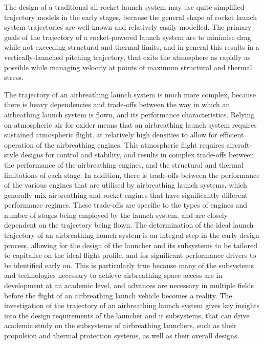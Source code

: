  
    The design of a traditional all-rocket launch system may use quite simplified trajectory models in the early stages, because the general shape of rocket launch system trajectories are well-known and relatively easily modelled.  The primary goals of the trajectory of a rocket-powered launch system are to minimise drag while not exceeding structural and thermal limits, and in general this results in a vertically-launched pitching trajectory, that exits the atmosphere as rapidly as possible while managing velocity at points of maximum structural and thermal stress. 
    
    The trajectory of an airbreathing launch system is much more complex, because there is heavy dependencies and trade-offs between the way in which an airbeathing launch system is flown, and its performance characteristics. Relying on atmospheric air for oxider means that an airbreathing launch system requires sustained atmospheric flight, at relatively high densities to allow for efficient operation of the airbreathing engines. This atmospheric flight requires aircraft-style designs for control and stability, and results in complex trade-offs between the performance of the airbreathing engines, and the structural and thermal limitations of each stage. In addition, there is trade-offs between the performance of the various engines that are utilised by airbreathing launch systems, which generally mix airbreathing and rocket engines that have significantly different performance regimes.
    These trade-offs are specific to the types of engines and number of stages being employed by the launch system, and are closely dependent on the trajectory being flown. The determination of the ideal launch trajectory of an airbreathing launch system is an integral step in the early design process, allowing for the design of the launcher and its subsystems to be tailored to capitalise on the ideal flight profile, and for significant performance drivers to be identified early on. 
  This is particularly true because many of the subsystems and technologies necessary to achieve airbreathing space access are in development at an academic level, and advances are necessary in multiple fields before the flight of an airbreathing launch vehicle becomes a reality. The investigation of the trajectory of an airbreathing launch system gives key insights into the design requirements of the launcher and it subsystems, that can drive academic study on the subsystems of airbreathing launchers, such as their propulsion and thermal protection systems, as well as their overall designs. 
    
  
